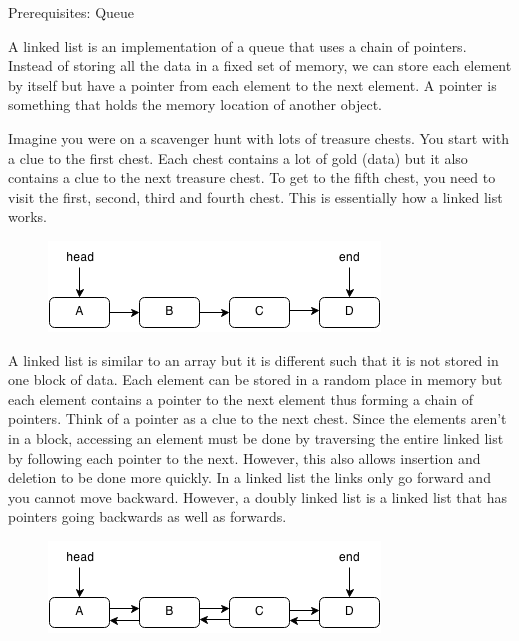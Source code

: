 \documentclass[11pt,oneside]{book}
\makeatletter
\def\maxwidth#1{\ifdim\Gin@nat@width>#1 #1\else\Gin@nat@width\fi}
\makeatother
\begin{document}
Prerequisites: Queue



A linked list is an implementation of a queue that uses a chain of pointers. Instead of storing all the data in a fixed set of memory, we can store each element by itself but have a pointer from each element to the next element. A pointer is something that holds the memory location of another object.

Imagine you were on a scavenger hunt with lots of treasure chests. You start with a clue to the first chest. Each chest contains a lot of gold (data) but it also contains a clue to the next treasure chest. To get to the fifth chest, you need to visit the first, second, third and fourth chest. This is essentially how a linked list works.

\vspace{5px}\begin{figure}[H]\centering
        \includegraphics[width=0.66\maxwidth{\textwidth}]{linkedlist.png}
        \end{figure}

A linked list is similar to an array but it is different such that it is not stored in one block of data. Each element can be stored in a random place in memory but each element contains a pointer to the next element thus forming a chain of pointers. Think of a pointer as a clue to the next chest. Since the elements aren't in a block, accessing an element must be done by traversing the entire linked list by following each pointer to the next. However, this also allows insertion and deletion to be done more quickly. In a linked list the links only go forward and you cannot move backward. However, a doubly linked list is a linked list that has pointers going backwards as well as forwards.

\vspace{5px}\begin{figure}[H]\centering
        \includegraphics[width=0.66\maxwidth{\textwidth}]{doublelinkedlist.png}
        \end{figure}
\end{document}
